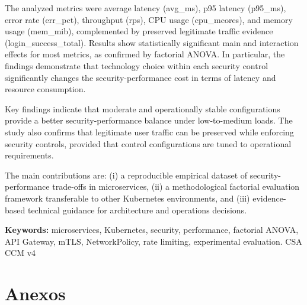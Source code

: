 \documentclass[12pt,letterpaper,fleqn]{report}
\begin{document}
The analyzed metrics were average latency (avg\_ms), p95 latency (p95\_ms), error rate (err\_pct), throughput (rps), CPU usage (cpu\_mcores), and memory usage (mem\_mib), complemented by preserved legitimate traffic evidence (login\_success\_total). Results show statistically significant main and interaction effects for most metrics, as confirmed by factorial ANOVA. In particular, the findings demonstrate that technology choice within each security control significantly changes the security-performance cost in terms of latency and resource consumption.

Key findings indicate that moderate and operationally stable configurations provide a better security-performance balance under low-to-medium loads. The study also confirms that legitimate user traffic can be preserved while enforcing security controls, provided that control configurations are tuned to operational requirements.

The main contributions are: (i) a reproducible empirical dataset of security-performance trade-offs in microservices, (ii) a methodological factorial evaluation framework transferable to other Kubernetes environments, and (iii) evidence-based technical guidance for architecture and operations decisions.

\textbf{Keywords:} microservices, Kubernetes, security, performance, factorial ANOVA, API Gateway, mTLS, NetworkPolicy, rate limiting, experimental evaluation. CSA CCM v4


\pagestyle{empty}
\setcounter{tocdepth}{2}
\tableofcontents
\listoffigures
\listoftables
\newpage

\pagestyle{plain}


















\appendix
\chapter{Anexos}
\end{document}
